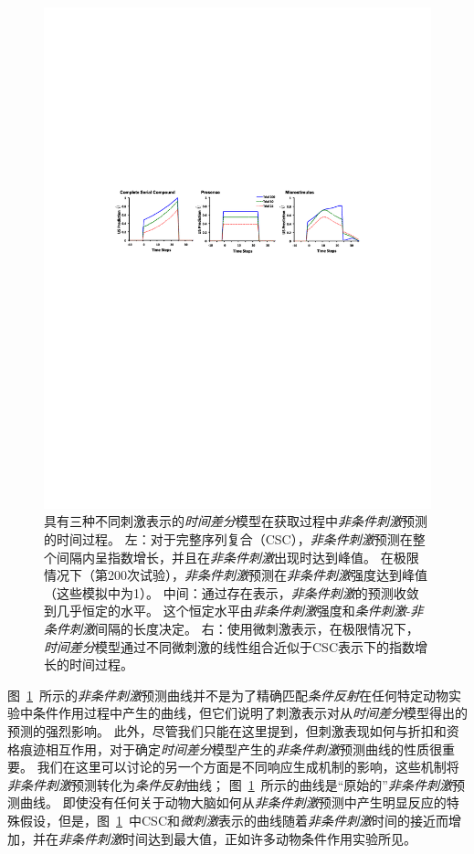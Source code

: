 \begin{figure}[!htb]
	\centering
	\includegraphics[width=0.8\linewidth]{chap11/fig_11_6}
	\caption{具有三种不同刺激表示的\textit{时间差分}模型在获取过程中\textit{非条件刺激}预测的时间过程。
		左：对于完整序列复合（CSC），\textit{非条件刺激}预测在整个间隔内呈指数增长，并且在\textit{非条件刺激}出现时达到峰值。
		在极限情况下（第200次试验），\textit{非条件刺激}预测在\textit{非条件刺激}强度达到峰值（这些模拟中为1）。
		中间：通过存在表示，\textit{非条件刺激}的预测收敛到几乎恒定的水平。
		这个恒定水平由\textit{非条件刺激}强度和\textit{条件刺激}-\textit{非条件刺激}间隔的长度决定。
		右：使用微刺激表示，在极限情况下，\textit{时间差分}模型通过不同微刺激的线性组合近似于CSC表示下的指数增长的时间过程。\label{fig:11_6}}
\end{figure}


图~\ref{fig:11_6}~所示的\textit{非条件刺激}预测曲线并不是为了精确匹配\textit{条件反射}在任何特定动物实验中条件作用过程中产生的曲线，但它们说明了刺激表示对从\textit{时间差分}模型得出的预测的强烈影响。
此外，尽管我们只能在这里提到，但刺激表现如何与折扣和资格痕迹相互作用，对于确定\textit{时间差分}模型产生的\textit{非条件刺激}预测曲线的性质很重要。
我们在这里可以讨论的另一个方面是不同响应生成机制的影响，这些机制将\textit{非条件刺激}预测转化为\textit{条件反射}曲线；
图~\ref{fig:11_6}~所示的曲线是“原始的”\textit{非条件刺激}预测曲线。
即使没有任何关于动物大脑如何从\textit{非条件刺激}预测中产生明显反应的特殊假设，但是，图~\ref{fig:11_6}~中CSC和\textit{微刺激}表示的曲线随着\textit{非条件刺激}时间的接近而增加，并在\textit{非条件刺激}时间达到最大值，正如许多动物条件作用实验所见。


